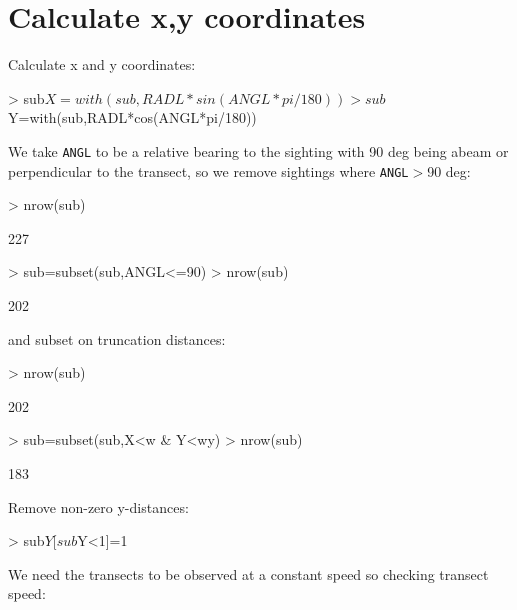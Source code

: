 \documentclass{article}
\begin{document}
\section{Calculate x,y coordinates}
Calculate x and y coordinates:
\begin{Schunk}
\begin{Sinput}
> sub$X=with(sub,RADL*sin(ANGL*pi/180))
> sub$Y=with(sub,RADL*cos(ANGL*pi/180))
\end{Sinput}
\end{Schunk}
We take \texttt{ANGL} to be a relative bearing to the sighting with 90 deg being abeam or perpendicular to the transect, so we remove sightings where \texttt{ANGL}$>$90 deg:
\begin{Schunk}
\begin{Sinput}
> nrow(sub)
\end{Sinput}
\begin{Soutput}
[1] 227
\end{Soutput}
\begin{Sinput}
> sub=subset(sub,ANGL<=90)
> nrow(sub)
\end{Sinput}
\begin{Soutput}
[1] 202
\end{Soutput}
\end{Schunk}
and subset on truncation distances:
\begin{Schunk}
\begin{Sinput}
> nrow(sub)
\end{Sinput}
\begin{Soutput}
[1] 202
\end{Soutput}
\begin{Sinput}
> sub=subset(sub,X<w & Y<wy)
> nrow(sub)
\end{Sinput}
\begin{Soutput}
[1] 183
\end{Soutput}
\end{Schunk}
Remove non-zero y-distances:
\begin{Schunk}
\begin{Sinput}
> sub$Y[sub$Y<1]=1
\end{Sinput}
\end{Schunk}
We need the transects to be observed at a constant speed so checking transect speed:
\end{document}
